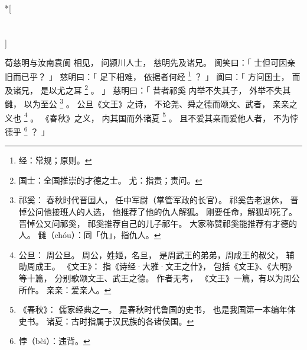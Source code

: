 
\switchcolumn[0]*[\section{}]

荀慈明与汝南袁阆
相见，
问颍川人士，
慈明先及诸兄。
阆笑曰：「
    士但可因亲旧而已乎？
」
慈明曰：「
    足下相难，
    依据者何经%
    \footnote{%
        经：常规；原则。
    }%
    ？
」
阆曰：「
    方问国士，
    而及诸兄，
    是以尤之耳%
    \footnote{%
        国士：全国推崇的才德之士。
        尤：指责；责问。
    }%
    。
」
慈明曰：「
    昔者祁奚
    内举不失其子，
    外举不失其雠，
    以为至公%
    \footnote{%
        祁奚：
            春秋时代晋国人，
            任中军尉（掌管军政的长官）。
            祁奚告老退休，
            晋悼公问他接班人的人选，
            他推荐了他的仇人解狐。
            刚要任命，解狐却死了。
            晋悼公又问祁奚，
            祁奚推荐自己的儿子祁午。
            大家称赞祁奚能推荐有才德的人。
        雠（chóu）：同「仇」，指仇人。
    }%
    。
    公旦《文王》之诗，
    不论尧、舜之德而颂文、武者，
    亲亲之义也%
    \footnote{%
        公旦：
            周公旦。
            周公，姓姬，名旦，
            是周武王的弟弟，周成王的叔父，
            辅助周成王。
        《文王》：
            指《诗经·大雅·文王之什》，
            包括《文王》、《大明》等十篇，
            分别歌颂文王、武王之德。
            作者无考，
            《文王》一篇，有以为周公所作。
        亲亲：爱亲人。
    }%
    。
    《春秋》之义，
    内其国而外诸夏%
    \footnote{%
        《春秋》：
            儒家经典之一。
            是春秋时代鲁国的史书，
            也是我国第一本编年体史书。
        诸夏：古时指属于汉民族的各诸侯国。
    }%
    。
    且不爱其亲而爱他人者，
    不为悖德乎%
    \footnote{%
        悖（bèi）：违背。
    }%
    ？
」

\switchcolumn




